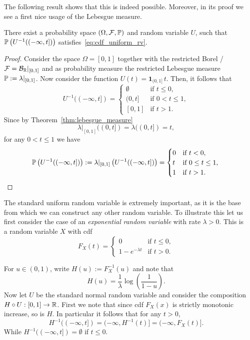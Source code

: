 The following result shows that this is indeed possible. Moreover, in its proof we see a first nice usage of the Lebesgue measure.

\begin{proposition}\label{prop:uniform_random_variable}
There exist a probability space $(\Omega,\mathcal F, \mathbb P)$ and random variable $U$, such that $\mathbb P\left(U^{-1}((-\infty,t])\right)$ satisfies~\eqref{eq:cdf_uniform_rv}.
\end{proposition}

\begin{proof}
Consider the space $\Omega = [0,1]$ together with the restricted Borel \sigalg/ $\mathcal F = \mathcal B_{\mathbb R}|_{[0,1]}$ and as probability measure the restricted Lebesgue measure $\mathbb P := \lambda|_{[0,1]}$. Now consider the function $U(t) = \mathbf{1}_{(0,1]} \, t$. Then, it follows that
\[
	U^{-1}((-\infty,t]) = \begin{cases}
		\emptyset &\text{if } t \le 0,\\
		(0,t] &\text{if } 0 < t \le 1, \\
		[0,1] &\text{if } t > 1.
	\end{cases}
\]
Since by Theorem~\ref{thm:lebesgue_measure}
\[
	\lambda|_{[0,1]}((0,t]) = \lambda((0,t]) = t,
\]
for any $0 < t \le 1$ we have
\[
	\mathbb P\left(U^{-1}((-\infty,t])\right) := \lambda|_{[0,1]}\left(U^{-1}((-\infty,t])\right)
	= \begin{cases}
		0 &\text{if } t < 0,\\
		t &\text{if } 0 \le t\le 1,\\
		1 &\text{if } t > 1.
	\end{cases}\qedhere
\]
\end{proof}

The standard uniform random variable is extremely important, as it is the base from which we can construct any other random variable. To illustrate this let us first consider the case of an \emph{exponential random variable} with rate $\lambda > 0$. This is a random variable $X$ with cdf
\[
	F_X(t) = \begin{cases}
		0 &\text{if } t \le 0,\\
		1-e^{-\lambda t} &\text{if } t > 0.
	\end{cases}
\]

For $u \in (0,1)$, write $H(u) := F_X^{-1}(u)$ and note that
\[
	H(u) = \frac{1}{\lambda} \log\left(\frac{1}{1-u}\right).
\]
Now let $U$ be the standard normal random variable and consider the composition $H \circ U : [0,1] \to \mathbb R$. First we note that since cdf $F_X(x)$ is strictly monotonic increase, so is $H$. In particular it follows that for any $t > 0$,
\[
	H^{-1}((-\infty,t]) = (-\infty, H^{-1}(t)] = (-\infty, F_X(t)].
\]
While $H^{-1}((-\infty,t]) = \emptyset$ if $t \le 0$.

